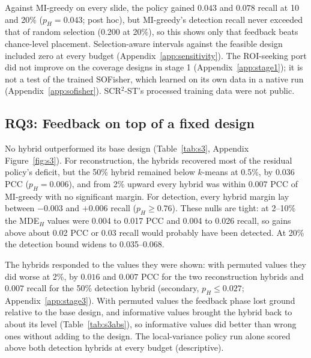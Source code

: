 \documentclass[10pt]{article}
\newcommand{\fittable}[1]{\resizebox{\ifdim\width>\linewidth\linewidth\else\width\fi}{!}{#1}}
\begin{document}
Against MI-greedy on every slide, the policy gained $0.043$ and $0.078$ recall at 10 and 20\% ($p_H=0.043$; post
hoc), but MI-greedy's detection recall never exceeded that of random selection (0.200 at 20\%), so this shows only
that feedback beats chance-level placement. Selection-aware intervals against the feasible design included zero at every budget
(Appendix~\ref{app:sensitivity}). The ROI-seeking port did not improve on the coverage designs
in stage 1 (Appendix~\ref{app:stage1}); it is not a test of the trained SOFisher, which learned on its own data in a
native run (Appendix~\ref{app:sofisher}). SCR$^2$-ST's processed training data were not public.

\begin{table}[t]
\centering
\caption{ROI-detection recall, mean over 22 slides. ``Random'' is the recall expected of random selection
($n/N$ for $n$ of $N$ regions). ``Informative'', ``permuted'', and ``constant'' denote the local-variance policy
with informative, permuted, and constant feedback. The oracle profiles regions in order of true heterogeneity.}
\label{tab:q2abs}
\fittable{\small}
\end{table}

\subsection{RQ3: Feedback on top of a fixed design}
No hybrid outperformed its base design (Table~\ref{tab:s3}, Appendix Figure~\ref{fig:s3}). For reconstruction, the
hybrids recovered most of the residual policy's deficit, but the 50\% hybrid remained below $k$-means at
0.5\%, by $0.036$ PCC ($p_H=0.006$), and from 2\% upward every hybrid was within $0.007$ PCC of MI-greedy with no
significant margin. For detection, every hybrid margin lay between $-0.003$ and $+0.006$ recall ($p_H\ge0.76$).
These nulls are tight: at 2--10\% the MDE$_H$ values were 0.004 to 0.017 PCC and 0.004 to 0.026 recall, so gains
above about 0.02 PCC or 0.03 recall would probably have been detected. At 20\% the detection bound widens to
0.035--0.068.

The hybrids responded to the values they were shown: with permuted values they did worse at 2\%, by $0.016$ and
$0.007$ PCC for the two reconstruction hybrids and $0.007$ recall for the 50\% detection hybrid (secondary,
$p_H\le0.027$; Appendix~\ref{app:stage3}). With permuted values the feedback phase lost ground relative to the base
design, and informative values brought the hybrid back to about its level (Table~\ref{tab:s3abs}), so informative
values did better than wrong ones without adding to the design. The local-variance policy run alone scored above
both detection hybrids at every budget (descriptive).
\end{document}

